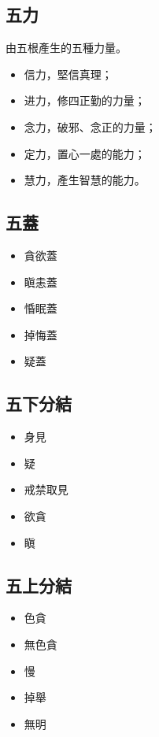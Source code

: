 \subsection{五力}
由五根產生的五種力量。
\begin{itemize}
  \item 信力，堅信真理；
  \item 进力，修四正勤的力量；
  \item 念力，破邪、念正的力量；
  \item 定力，置心一處的能力；
  \item 慧力，產生智慧的能力。
\end{itemize}

\subsection{五蓋}
\begin{itemize}
  \item 貪欲蓋
  \item 瞋恚蓋
  \item 惛眠蓋
  \item 掉悔蓋
  \item 疑蓋
\end{itemize}

\subsection{五下分結}
\begin{itemize}
  \item 身見
  \item 疑
  \item 戒禁取見
  \item 欲貪
  \item 瞋
\end{itemize}

\subsection{五上分結}
\begin{itemize}
  \item 色貪
  \item 無色貪
  \item 慢
  \item 掉舉
  \item 無明
\end{itemize}


